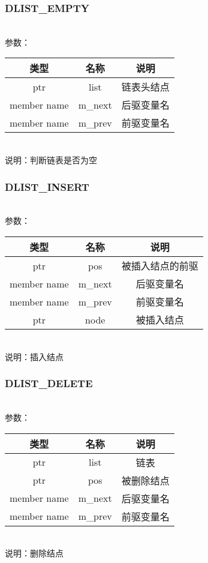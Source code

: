 \subsubsection{DLIST\_EMPTY}
\\
参数：\\
\begin{tabular}{|c|c|c|}
    \hline
    类型 & 名称 & 说明\\\hline
    ptr & list & 链表头结点\\\hline
    member name & m\_next & 后驱变量名\\\hline
    member name & m\_prev & 前驱变量名\\\hline
\end{tabular}\\
说明：判断链表是否为空

\subsubsection{DLIST\_INSERT}
\\
参数：\\
\begin{tabular}{|c|c|c|}
    \hline
    类型 & 名称 & 说明\\\hline
    ptr & pos & 被插入结点的前驱\\\hline
    member name & m\_next & 后驱变量名\\\hline
    member name & m\_prev & 前驱变量名\\\hline
    ptr & node & 被插入结点\\\hline
\end{tabular}\\
说明：插入结点


\subsubsection{DLIST\_DELETE}
\\
参数：\\
\begin{tabular}{|c|c|c|}
    \hline
    类型 & 名称 & 说明\\\hline
    ptr & list & 链表\\\hline
    ptr & pos & 被删除结点\\\hline
    member name & m\_next & 后驱变量名\\\hline
    member name & m\_prev & 前驱变量名\\\hline
\end{tabular}\\
说明：删除结点

